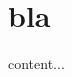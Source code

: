 \documentclass{beamer}
\begin{document}
\section{bla}

\begin{frame}
    content...
\end{frame}
\end{document}
